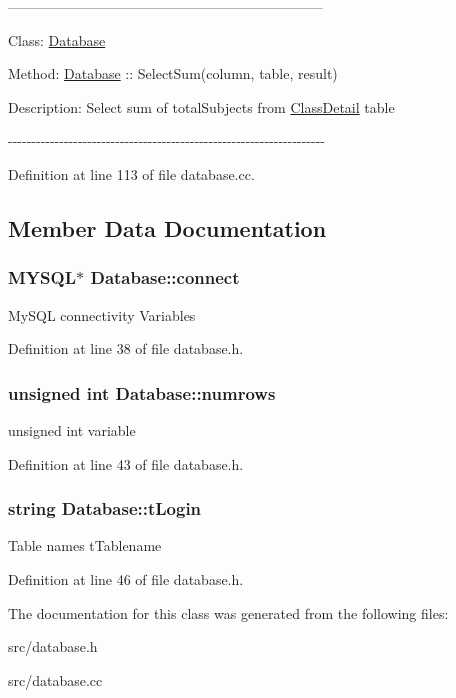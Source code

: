 --------------------------------------------------------------------\par
 Class\-: \hyperlink{classDatabase}{Database} \par
 Method\-: \hyperlink{classDatabase}{Database} \-:\-: Select\-Sum(column, table, result) \par
 Description\-: Select sum of total\-Subjects from \hyperlink{classClassDetail}{Class\-Detail} table \par
 -\/-\/-\/-\/-\/-\/-\/-\/-\/-\/-\/-\/-\/-\/-\/-\/-\/-\/-\/-\/-\/-\/-\/-\/-\/-\/-\/-\/-\/-\/-\/-\/-\/-\/-\/-\/-\/-\/-\/-\/-\/-\/-\/-\/-\/-\/-\/-\/-\/-\/-\/-\/-\/-\/-\/-\/-\/-\/-\/-\/-\/-\/-\/-\/-\/-\/-\/-\/ 

Definition at line 113 of file database.\-cc.



\subsection{Member Data Documentation}
\hypertarget{classDatabase_aa232b806b05ef654cd5579bca5f1dbad}{
\subsubsection[{connect}]{\setlength{\rightskip}{0pt plus 5cm}M\-Y\-S\-Q\-L$\ast$ Database\-::connect\hspace{0.3cm}{\ttfamily [protected]}}}\label{classDatabase_aa232b806b05ef654cd5579bca5f1dbad}
My\-S\-Q\-L connectivity Variables 

Definition at line 38 of file database.\-h.

\hypertarget{classDatabase_a02965883689dd1d8007c86cebf6df89e}{
\subsubsection[{numrows}]{\setlength{\rightskip}{0pt plus 5cm}unsigned int Database\-::numrows\hspace{0.3cm}{\ttfamily [protected]}}}\label{classDatabase_a02965883689dd1d8007c86cebf6df89e}
unsigned int variable 

Definition at line 43 of file database.\-h.

\hypertarget{classDatabase_acd64ff0e98b28cd1c6928a1236634521}{
\subsubsection[{t\-Login}]{\setlength{\rightskip}{0pt plus 5cm}string Database\-::t\-Login\hspace{0.3cm}{\ttfamily [protected]}}}\label{classDatabase_acd64ff0e98b28cd1c6928a1236634521}
Table names t\-Tablename 

Definition at line 46 of file database.\-h.



The documentation for this class was generated from the following files\-:\begin{DoxyCompactItemize}
\item 
src/database.\-h\item 
src/database.\-cc\end{DoxyCompactItemize}
